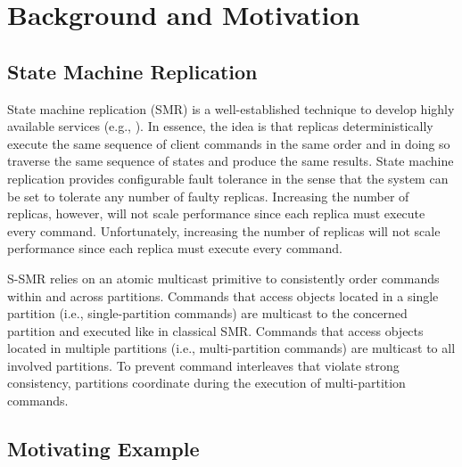 

\section{Background and Motivation}




\subsection{State Machine Replication}

State machine replication (SMR) is a well-established technique to
develop highly available services (e.g.,
\cite{Shvachko:2003,Ghemawat:2003,Burrows:2006,MacCormick:2004}).  In
essence, the idea is that replicas deterministically execute the same
sequence of client commands in the same order and in doing so traverse
the same sequence of states and produce the same results.  State
machine replication provides configurable fault tolerance in the sense
that the system can be set to tolerate any number of faulty replicas.
Increasing the number of replicas, however, will not scale performance
since each replica must execute every command.  Unfortunately,
increasing the number of replicas will not scale performance since
each replica must execute every command.

S-SMR relies on an atomic multicast primitive to consistently order
commands within and across partitions.  Commands that access objects
located in a single partition (i.e., single-partition commands) are
multicast to the concerned partition and executed like in classical
SMR.  Commands that access objects located in multiple partitions
(i.e., multi-partition commands) are multicast to all involved
partitions.  To prevent command interleaves that violate strong
consistency, partitions coordinate during the execution of
multi-partition commands.



\subsection{Motivating Example}
